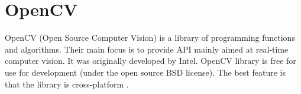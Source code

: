 \section{OpenCV}
OpenCV (Open Source Computer Vision) is a library of programming functions and algorithms. Their main focus is to provide API mainly aimed at real-time computer vision. It was
originally developed by Intel. OpenCV library is free for use for development (under the open
source BSD license). The best feature is that the library is cross-platform . \cite{TesseractTrain}